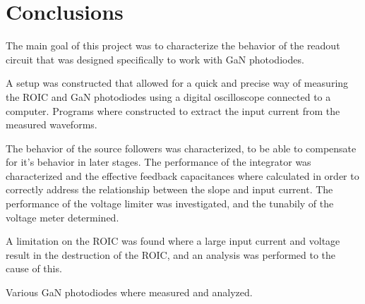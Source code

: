 \section{Conclusions}\label{sec:conclusions_and_future_work}
The main goal of this project was to characterize the behavior of the readout circuit that was designed specifically to work with GaN photodiodes.

A setup was constructed that allowed for a quick and precise way of measuring the ROIC and GaN photodiodes using a digital oscilloscope connected to a computer. Programs where constructed to extract the input current from the measured waveforms.

The behavior of the source followers was characterized, to be able to compensate for it's behavior in later stages. The performance of the integrator was characterized and the effective feedback capacitances where calculated in order to correctly address the relationship between the slope and input current. The performance of the voltage limiter was investigated, and the tunabily of the voltage meter determined. 

A limitation on the ROIC was found where a large input current and voltage result in the destruction of the ROIC, and an analysis was performed to the cause of this.

Various GaN photodiodes where measured and analyzed.



